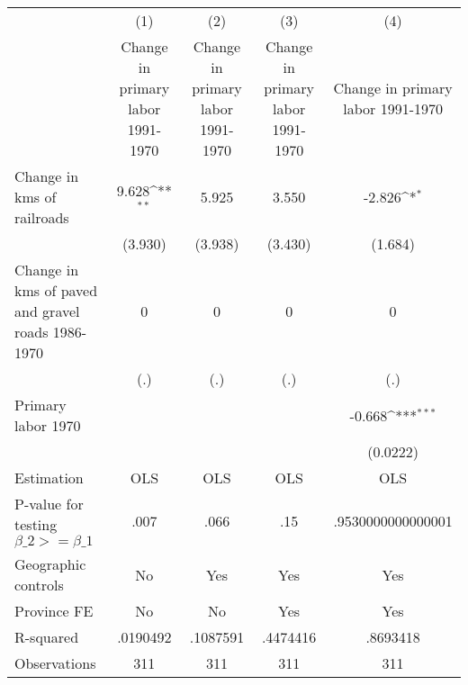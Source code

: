 {
\def\sym#1{\ifmmode^{#1}\else\(^{#1}\)\fi}
\begin{tabular}{l*{4}{c}}
\hline\hline
                &\multicolumn{1}{c}{(1)}&\multicolumn{1}{c}{(2)}&\multicolumn{1}{c}{(3)}&\multicolumn{1}{c}{(4)}\\
                &\multicolumn{1}{c}{Change in primary labor 1991-1970}&\multicolumn{1}{c}{Change in primary labor 1991-1970}&\multicolumn{1}{c}{Change in primary labor 1991-1970}&\multicolumn{1}{c}{Change in primary labor 1991-1970}\\
\hline
Change in kms of railroads&    9.628\sym{**} &    5.925         &    3.550         &   -2.826\sym{*}  \\
                &  (3.930)         &  (3.938)         &  (3.430)         &  (1.684)         \\
[1em]
Change in kms of paved and gravel roads 1986-1970&        0         &        0         &        0         &        0         \\
                &      (.)         &      (.)         &      (.)         &      (.)         \\
[1em]
Primary labor 1970&                  &                  &                  &   -0.668\sym{***}\\
                &                  &                  &                  & (0.0222)         \\
\hline
Estimation      &      OLS         &      OLS         &      OLS         &      OLS         \\
P-value for testing $\beta\_2 >= \beta\_1$&     .007         &     .066         &      .15         &.9530000000000001         \\
Geographic controls&       No         &      Yes         &      Yes         &      Yes         \\
Province FE     &       No         &       No         &      Yes         &      Yes         \\
R-squared       & .0190492         & .1087591         & .4474416         & .8693418         \\
Observations    &      311         &      311         &      311         &      311         \\
\hline\hline
\end{tabular}
}

